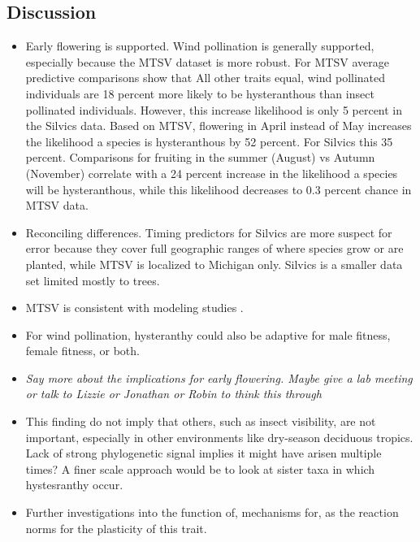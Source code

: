 \documentclass{article}\usepackage[]{graphicx}\usepackage[]{color}
\begin{document}
\begin{itemize}
\section*{Discussion}
\begin{itemize}
\item Early flowering is supported. Wind pollination is generally supported, especially because the MTSV dataset is more robust. For MTSV average predictive comparisons show that All other traits equal, wind pollinated individuals are 18 percent more likely to be hysteranthous than insect pollinated individuals. However, this increase likelihood is only 5 percent in the Silvics data. Based on MTSV, flowering in April instead of May increases the likelihood a species is hysteranthous by 52 percent.  For Silvics this 35 percent. Comparisons for fruiting in the summer (August) vs Autumn (November) correlate with a 24 percent increase in the likelihood a species will be hysteranthous, while this likelihood decreases to 0.3 percent chance in MTSV data.
\item Reconciling differences. Timing predictors for Silvics are more suspect for error because they cover full geographic ranges of where species grow or are planted, while MTSV is localized to Michigan only. Silvics is a smaller data set limited mostly to trees.
\item MTSV is consistent with modeling studies \citep{Whitehead67}.
\item For wind pollination, hysteranthy could also be adaptive for male fitness, female fitness, or both.
\item \textit{Say more about the implications for early flowering. Maybe give a lab meeting or talk to Lizzie or Jonathan or Robin to think this through}
\item This finding do not imply that others, such as insect visibility, are not important, especially in other environments like dry-season deciduous tropics.\\ Lack of strong phylogenetic signal implies it might have arisen multiple times? A finer scale approach would be to look at sister taxa in which hystesranthy occur. 
\item Further investigations into the function of, mechanisms for, as the reaction norms for the plasticity of this trait.
\end{itemize}

\end{itemize}
\end{document}
